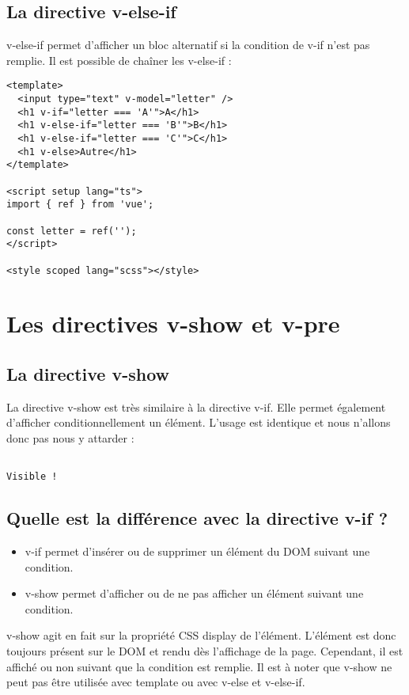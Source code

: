 \subsection{La directive {\color{monOrange}v-else-if}}
{\color{monOrange}v-else-if} permet d'afficher un bloc alternatif si la condition de {\color{monOrange}v-if} n'est pas remplie. Il est possible de chaîner les {\color{monOrange}v-else-if} :
\begin{verbatim}
<template>
  <input type="text" v-model="letter" />
  <h1 v-if="letter === 'A'">A</h1>
  <h1 v-else-if="letter === 'B'">B</h1>
  <h1 v-else-if="letter === 'C'">C</h1>
  <h1 v-else>Autre</h1>
</template>

<script setup lang="ts">
import { ref } from 'vue';

const letter = ref('');
</script>

<style scoped lang="scss"></style>
\end{verbatim}


\section{Les directives v-show et v-pre}
\subsection{La directive {\color{monOrange}v-show}}
La directive {\color{monOrange}v-show} est très similaire à la directive {\color{monOrange}v-if}. Elle permet également d'afficher conditionnellement un élément. L'usage est identique et nous n'allons donc pas nous y attarder :

\begin{verbatim}

Visible !

\end{verbatim}

\subsection{Quelle est la différence avec la directive {\color{monOrange}v-if} ?}
\begin{itemize}
\item {\color{monOrange}v-if} permet d'insérer ou de supprimer un élément du DOM suivant une condition.
\item {\color{monOrange}v-show} permet d'afficher ou de ne pas afficher un élément suivant une condition.
\end{itemize}
 {\color{monOrange}v-show} agit en fait sur la propriété CSS display de l'élément. L'élément est donc toujours présent sur le DOM et rendu dès l'affichage de la page. Cependant, il est affiché ou non suivant que la condition est remplie. Il est à noter que {\color{monOrange}v-show} ne peut pas être utilisée avec {\color{monOrange}template} ou avec {\color{monOrange}v-else} et {\color{monOrange}v-else-if}.

